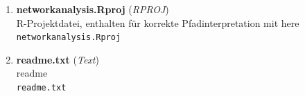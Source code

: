 \begin{enumerate}[label=B\arabic*, ref=B\arabic*, leftmargin=*, itemsep=0.5em, topsep=0.3em]
\item \textbf{networkanalysis.Rproj} \textnormal{(\textit{RPROJ})}\\
R-Projektdatei, enthalten für korrekte Pfadinterpretation mit here\\
\texttt{\small networkanalysis.Rproj}
\edef\appendixlabelkey{app:B\arabic{enumi}}
\expandafter\label\expandafter{\appendixlabelkey}
\item \textbf{readme.txt} \textnormal{(\textit{Text})}\\
readme\\
\texttt{\small readme.txt}
\edef\appendixlabelkey{app:B\arabic{enumi}}
\expandafter\label\expandafter{\appendixlabelkey}
\end{enumerate}
